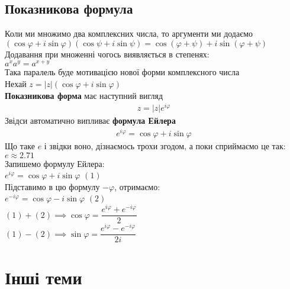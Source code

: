 \documentclass[a4paper, 14pt]{extarticle}
\def\bigline{\vspace{5mm}\\}
\theoremstyle{theoremdd}
\theoremstyle{theoremdd}
\theoremstyle{theoremdd}
\theoremstyle{theoremdd}
\theoremstyle{theoremdd}
\theoremstyle{theoremdd}
\theoremstyle{theoremdd}
\theoremstyle{theoremdd}
\begin{document}
\subsection{Показникова формула}
Коли ми множимо два комплексних числа, то аргументи ми додаємо\\
$(\cos \varphi + i \sin \varphi)(\cos \psi + i \sin \psi) = \cos (\varphi + \psi) + i \sin (\varphi + \psi)$\\
Додавання при множенні чогось виявляється в степенях:\\
$a^x a^y = a^{x+y}$\\
Така паралель буде мотивацією нової форми комплексного числа\\
Нехай $z = |z|(\cos \varphi + i \sin \varphi)$\\
\textbf{Показникова форма} має наступний вигляд
\begin{align*}
z = |z|e^{i \varphi}
\end{align*}
Звідси автоматично випливає \textbf{формула Ейлера}
\begin{align*}
e^{i \varphi} = \cos \varphi + i \sin \varphi
\end{align*}
Що таке $e$ і звідки воно, дізнаємось трохи згодом, а поки сприймаємо це так: $e \approx 2.71$
\bigline
Запишемо формулу Ейлера:\\
$e^{i \varphi} = \cos \varphi + i \sin \varphi$ $(1)$\\
Підставимо в цю формулу $-\varphi$, отримаємо:\\
$e^{-i \varphi} = \cos \varphi - i \sin \varphi$ $(2)$\\
$(1) + (2) \implies \cos \varphi = \dfrac{e^{i \varphi} + e^{-i \varphi}}{2}$\\
$(1) - (2) \implies \sin \varphi = \dfrac{e^{i \varphi} - e^{-i \varphi}}{2i}$
\newpage

\section{Інші теми}
\end{document}

